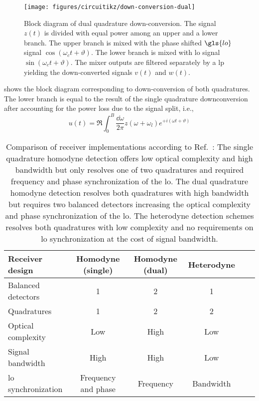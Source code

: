 
\begin{figure}[htb]
	\centering
	\texttt{[image: figures/circuitikz/down-conversion-dual]}
	\caption{Block diagram of dual quadrature down-conversion. The signal $z(t)$ is divided with equal power among an upper and a lower branch. The upper branch is mixed with the phase shifted $\gls{lo}$ signal $\cos(\omega_ct+\vartheta)$. The lower branch is mixed with \gls{lo} signal $\sin(\omega_ct+\vartheta)$. The mixer outputs are filtered separately by a \gls{lp} yielding the down-converted signals $v(t)$ and $w(t)$.}\label{fig:down_conversion_dual}
\end{figure}
 shows the block diagram corresponding to down-conversion of both quadratures.
The lower branch is equal to the result of the single quadrature downconversion after accounting for the power loss due to the signal split, i.e.,
\begin{equation}
	u(t)
	=
	\Re
	\int_0^B\frac{\dd{\omega}}{2\pi}
	z(\omega+\omega_l)
	e^{+i(\omega t+\vartheta)}
	\label{eq:down_conversion_real}	
\end{equation}


\begin{table}[htb]
  \centering
  \begin{tabular}{lccccc}
    \toprule
    Receiver design & Homodyne (single) & Homodyne (dual) & Heterodyne \\
    \midrule
    Balanced detectors & \num{1} & \num{2} & \num{1} \\
    Quadratures & \num{1} & \num{2} & \num{2} \\
    Optical complexity & Low & High & Low \\
    Signal bandwidth & High & High & Low \\
    \gls{lo} synchronization & Frequency and phase & Frequency & Bandwidth \\
    \bottomrule
  \end{tabular}
  \caption{Comparison of receiver implementations according to Ref.~\cite{Brunner2017}: The single quadrature homodyne detection offers low optical complexity and high bandwidth but only resolves one of two quadratures and required frequency and phase synchronization of the \gls{lo}. The dual quadrature homodyne detection resolves both quadratures with high bandwidth but requires two balanced detectors increasing the optical complexity and phase synchronization of the \gls{lo}. The heterodyne detection schemes resolves both quadratures with low complexity and no requirements on \gls{lo} synchronization at the cost of signal bandwidth.}\label{tab:receivers}
\end{table}

